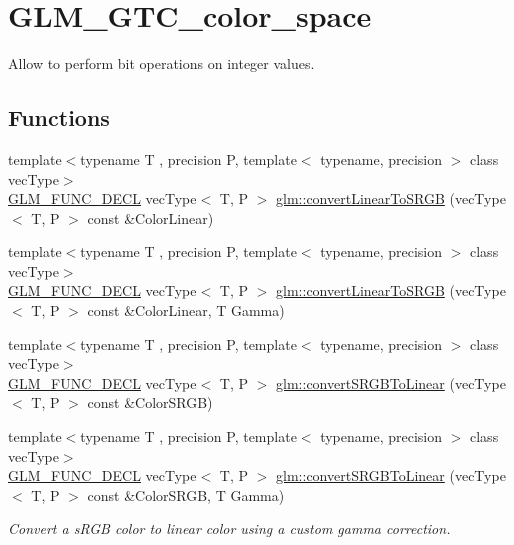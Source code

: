 \hypertarget{group__gtc__color__space}{}\section{G\+L\+M\+\_\+\+G\+T\+C\+\_\+color\+\_\+space}
\label{group__gtc__color__space}


Allow to perform bit operations on integer values.  


\subsection*{Functions}
\begin{DoxyCompactItemize}
\item 
{\footnotesize template$<$typename T , precision P, template$<$ typename, precision $>$ class vec\+Type$>$ }\\\mbox{\hyperlink{setup_8hpp_ab2d052de21a70539923e9bcbf6e83a51}{G\+L\+M\+\_\+\+F\+U\+N\+C\+\_\+\+D\+E\+CL}} vec\+Type$<$ T, P $>$ \mbox{\hyperlink{group__gtc__color__space_gad813dcd99644cafc775e83d6504ccb93}{glm\+::convert\+Linear\+To\+S\+R\+GB}} (vec\+Type$<$ T, P $>$ const \&Color\+Linear)
\item 
{\footnotesize template$<$typename T , precision P, template$<$ typename, precision $>$ class vec\+Type$>$ }\\\mbox{\hyperlink{setup_8hpp_ab2d052de21a70539923e9bcbf6e83a51}{G\+L\+M\+\_\+\+F\+U\+N\+C\+\_\+\+D\+E\+CL}} vec\+Type$<$ T, P $>$ \mbox{\hyperlink{group__gtc__color__space_ga63f8b003da7acf44370eb47bfb8b3d42}{glm\+::convert\+Linear\+To\+S\+R\+GB}} (vec\+Type$<$ T, P $>$ const \&Color\+Linear, T Gamma)
\item 
{\footnotesize template$<$typename T , precision P, template$<$ typename, precision $>$ class vec\+Type$>$ }\\\mbox{\hyperlink{setup_8hpp_ab2d052de21a70539923e9bcbf6e83a51}{G\+L\+M\+\_\+\+F\+U\+N\+C\+\_\+\+D\+E\+CL}} vec\+Type$<$ T, P $>$ \mbox{\hyperlink{group__gtc__color__space_ga28e98e64347cf385cadc1ceb4def55c9}{glm\+::convert\+S\+R\+G\+B\+To\+Linear}} (vec\+Type$<$ T, P $>$ const \&Color\+S\+R\+GB)
\item 
{\footnotesize template$<$typename T , precision P, template$<$ typename, precision $>$ class vec\+Type$>$ }\\\mbox{\hyperlink{setup_8hpp_ab2d052de21a70539923e9bcbf6e83a51}{G\+L\+M\+\_\+\+F\+U\+N\+C\+\_\+\+D\+E\+CL}} vec\+Type$<$ T, P $>$ \mbox{\hyperlink{group__gtc__color__space_ga61c4f0efdf55c29d9cfbd26141fddef8}{glm\+::convert\+S\+R\+G\+B\+To\+Linear}} (vec\+Type$<$ T, P $>$ const \&Color\+S\+R\+GB, T Gamma)
\begin{DoxyCompactList}\small\item\em Convert a s\+R\+GB color to linear color using a custom gamma correction. \end{DoxyCompactList}\end{DoxyCompactItemize}


